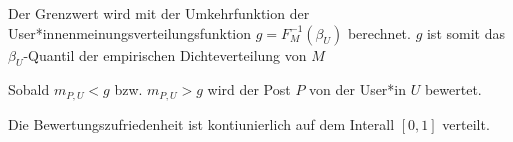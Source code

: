 Der Grenzwert wird mit der Umkehrfunktion der User*innenmeinungsverteilungsfunktion $g = F_M^{-1}(\beta_U)$ berechnet.
$g$ ist somit das $\beta_U$-Quantil der empirischen Dichteverteilung von $M$

Sobald $m_{P,U} < g$ bzw. $m_{P,U} > g$ wird der Post $P$ von der User*in $U$ bewertet. 

Die Bewertungszufriedenheit ist kontiunierlich auf dem Interall $[0,1]$ verteilt. 
